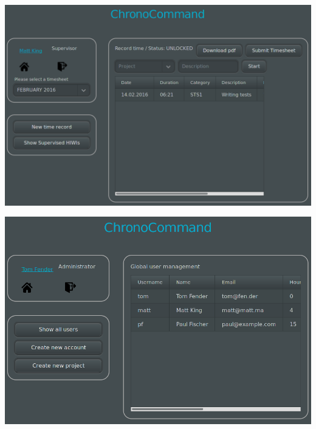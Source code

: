 \begin{frame}
	\begin{center}
		\includegraphics[width=\linewidth,height=0.9\textheight,keepaspectratio]{images/supervisor-defaultview.png}
	\end{center}
\end{frame}

\begin{frame}
	\begin{center}
		\includegraphics[width=\linewidth,height=0.9\textheight,keepaspectratio]{images/admin-defaultview.png}
	\end{center}
\end{frame}

